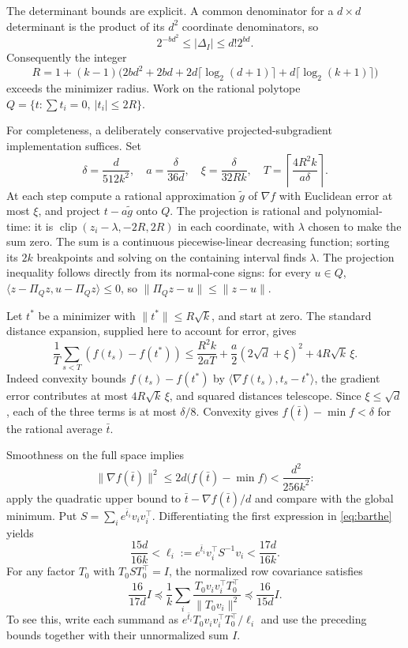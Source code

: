 \documentclass[11pt]{article}
\newcommand{\1}{\mathbf 1}
\begin{document}
The determinant bounds are explicit. A common denominator for a $d\times d$ determinant is the product of its $d^2$ coordinate denominators, so
\[
 2^{-bd^2}\le|\Delta_I|\le d!2^{bd}.
\]
Consequently the integer
\[
 R=1+(k-1)\bigl(2bd^2+2bd+2d\lceil\log_2(d+1)\rceil
 +d\lceil\log_2(k+1)\rceil\bigr)
\]
exceeds the minimizer radius. Work on the rational polytope
$Q=\{t:\sum t_i=0,\ |t_i|\le2R\}$.

For completeness, a deliberately conservative projected-subgradient implementation suffices. Set
\[
 \delta=\frac{d}{512k^2},\quad a=\frac{\delta}{36d},\quad
 \xi=\frac{\delta}{32Rk},\quad
 T=\left\lceil\frac{4R^2k}{a\delta}\right\rceil.
\]
At each step compute a rational approximation $\widetilde g$ of $\nabla f$ with Euclidean error at most $\xi$, and project $t-a\widetilde g$ onto $Q$. The projection is rational and polynomial-time: it is $\operatorname{clip}(z_i-\lambda,-2R,2R)$ in each coordinate, with $\lambda$ chosen to make the sum zero. The sum is a continuous piecewise-linear decreasing function; sorting its $2k$ breakpoints and solving on the containing interval finds $\lambda$. The projection inequality follows directly from its normal-cone signs: for every $u\in Q$, $\langle z-\Pi_Qz,u-\Pi_Qz\rangle\le0$, so $\|\Pi_Qz-u\|\le\|z-u\|$.

Let $t^*$ be a minimizer with $\|t^*\|\le R\sqrt k$, and start at zero. The standard distance expansion, supplied here to account for error, gives
\[
 \frac1T\sum_{s<T}(f(t_s)-f(t^*))
 \le \frac{R^2k}{2aT}
 +\frac a2(2\sqrt d+\xi)^2+4R\sqrt k\,\xi.
\]
Indeed convexity bounds $f(t_s)-f(t^*)$ by $\langle\nabla f(t_s),t_s-t^*\rangle$, the gradient error contributes at most $4R\sqrt k\,\xi$, and squared distances telescope. Since $\xi\le\sqrt d$, each of the three terms is at most $\delta/8$. Convexity gives $f(\bar t)-\min f<\delta$ for the rational average $\bar t$.

Smoothness on the full space implies
\[
 \|\nabla f(\bar t)\|^2\le2d\bigl(f(\bar t)-\min f\bigr)
 <\frac{d^2}{256k^2}:
\]
apply the quadratic upper bound to $\bar t-\nabla f(\bar t)/d$ and compare with the global minimum. Put $S=\sum_i e^{\bar t_i}v_iv_i^\top$. Differentiating the first expression in \eqref{eq:barthe} yields
\[
 \frac{15d}{16k}<\ell_i:=e^{\bar t_i}v_i^\top S^{-1}v_i<\frac{17d}{16k}.
\]
For any factor $T_0$ with $T_0ST_0^\top=I$, the normalized row covariance satisfies
\[
 \frac{16}{17d}I\preceq
 \frac1k\sum_i\frac{T_0v_i v_i^\top T_0^\top}{\|T_0v_i\|^2}
 \preceq\frac{16}{15d}I.
\]
To see this, write each summand as $e^{\bar t_i}T_0v_iv_i^\top T_0^\top/\ell_i$ and use the preceding bounds together with their unnormalized sum $I$.
\end{document}
